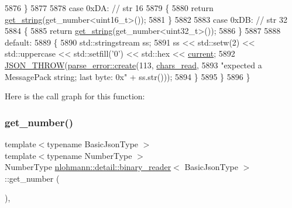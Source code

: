 \begin{DoxyCode}
5876             \}
5877 
5878             \textcolor{keywordflow}{case} 0xDA: \textcolor{comment}{// str 16}
5879             \{
5880                 \textcolor{keywordflow}{return} \hyperlink{classnlohmann_1_1detail_1_1binary__reader_a195b573a807da6d5841a898c6f74e03c}{get\_string}(get\_number<uint16\_t>());
5881             \}
5882 
5883             \textcolor{keywordflow}{case} 0xDB: \textcolor{comment}{// str 32}
5884             \{
5885                 \textcolor{keywordflow}{return} \hyperlink{classnlohmann_1_1detail_1_1binary__reader_a195b573a807da6d5841a898c6f74e03c}{get\_string}(get\_number<uint32\_t>());
5886             \}
5887 
5888             \textcolor{keywordflow}{default}:
5889             \{
5890                 std::stringstream ss;
5891                 ss << std::setw(2) << std::uppercase << std::setfill(\textcolor{charliteral}{'0'}) << std::hex << 
      \hyperlink{classnlohmann_1_1detail_1_1binary__reader_a7e994e201b215cd6d6ae28a1853f43e0}{current};
5892                 \hyperlink{json_8hpp_a6c274f6db2e65c1b66c7d41b06ad690f}{JSON\_THROW}(\hyperlink{classnlohmann_1_1detail_1_1parse__error_a9fd60ad6bce80fd99686ad332faefd37}{parse\_error::create}(113, 
      \hyperlink{classnlohmann_1_1detail_1_1binary__reader_a2dbde0b7390100efe0bfc54e21c3a34b}{chars\_read},
5893                                                \textcolor{stringliteral}{"expected a MessagePack string; last byte: 0x"} + ss.str()));
5894             \}
5895         \}
5896     \}
\end{DoxyCode}
Here is the call graph for this function\+:
\mbox{\label{classnlohmann_1_1detail_1_1binary__reader_a3e87e5b33764fc085bfce41d64247279}} 
\subsubsection{\texorpdfstring{get\+\_\+number()}{get\_number()}}
{\footnotesize\ttfamily template$<$typename Basic\+Json\+Type $>$ \\
template$<$typename Number\+Type $>$ \\
Number\+Type \hyperlink{classnlohmann_1_1detail_1_1binary__reader}{nlohmann\+::detail\+::binary\+\_\+reader}$<$ Basic\+Json\+Type $>$\+::get\+\_\+number (\begin{DoxyParamCaption}{ }\end{DoxyParamCaption})\hspace{0.3cm}{\ttfamily [inline]}, {\ttfamily [private]}}



